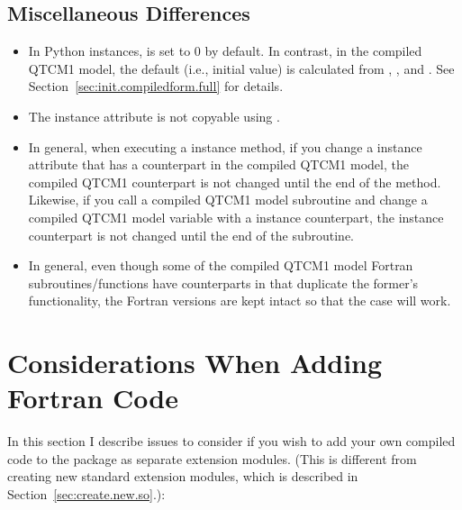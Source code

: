 	\subsection{Miscellaneous Differences}

\begin{itemize}
\item In Python  instances,
	 is set to 0 by default.  
	In contrast, in the compiled QTCM1 model,
	the default (i.e., initial value) is calculated from 
	, , and .
	See Section~\ref{sec:init.compiledform.full} for details.

\item The  instance attribute
	 is not copyable using .

\item In general, when executing a  instance method, 
	if you change a  instance attribute 
	that has a counterpart in the compiled QTCM1 model,
	the compiled QTCM1 counterpart is not changed until the
	end of the method.  Likewise, if you call a compiled QTCM1 model
	subroutine and change a compiled QTCM1 model variable with
	a  instance counterpart, the 
	instance counterpart is not changed until the end of the
	subroutine.

\item In general, even though some of the compiled QTCM1 model
	Fortran subroutines/functions have counterparts in 
	that duplicate the former's functionality, the Fortran
	versions are kept intact so that the
	 case will work.
\end{itemize}




\section{Considerations When Adding Fortran Code}

In this section I describe issues to consider if you wish to add
your own compiled code to the package as separate extension modules.
(This is different from creating new standard extension modules,
which is described in Section~\ref{sec:create.new.so}.):

